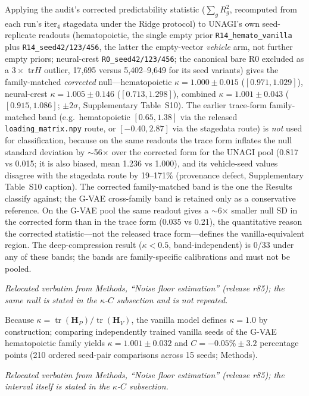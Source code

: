 \documentclass[11 pt,a4 paper]{article}
\begin{document}
Applying the audit's corrected predictability statistic ($\sum_g R^2_g$, recomputed from each run's iter$_4$ stagedata under the Ridge protocol) to UNAGI's own seed-replicate readouts (hematopoietic, the single empty prior \texttt{R14\_hemato\_vanilla} plus \texttt{R14\_seed42/123/456}, the latter the empty-vector \emph{vehicle} arm, not further empty priors; neural-crest \texttt{R0\_seed42/123/456}; the canonical bare R0 excluded as a $3\times$ tr$H$ outlier, 17{,}695 versus 5,402--9,649 for its seed variants) gives the family-matched \emph{corrected} null---hematopoietic $\kappa=1.000\pm0.015$ ($[0.971,1.029]$), neural-crest $\kappa=1.005\pm0.146$ ($[0.713,1.298]$), combined $\kappa=1.001\pm0.043$ ($[0.915,1.086]$; $\pm2\sigma$, Supplementary Table~S10). The earlier trace-form family-matched band (e.g.\ hematopoietic $[0.65,1.38]$ via the released \texttt{loading\_matrix.npy} route, or $[-0.40,2.87]$ via the stagedata route) is \emph{not} used for classification, because on the same readouts the trace form inflates the null standard deviation by $\sim$56$\times$ over the corrected form for the UNAGI pool (0.817 vs 0.015; it is also biased, mean 1.236 vs 1.000), and its vehicle-seed values disagree with the stagedata route by 19--171\% (provenance defect, Supplementary Table~S10 caption). The corrected family-matched band is the one the Results classify against; the G-VAE cross-family band is retained only as a conservative reference. On the G-VAE pool the same readout gives a $\sim$6$\times$ smaller null SD in the corrected form than in the trace form (0.035 vs 0.21), the quantitative reason the corrected statistic---not the released trace form---defines the vanilla-equivalent region. The deep-compression result ($\kappa<0.5$, band-independent) is 0/33 under any of these bands; the bands are family-specific calibrations and must not be pooled.

\noindent\emph{Relocated verbatim from Methods, ``Noise floor estimation'' (release r85); the same null is stated in the $\kappa$-$C$ subsection and is not repeated.}

Because $\kappa=\operatorname{tr}(\mathbf{H}_P)/\operatorname{tr}(\mathbf{H}_V)$, the vanilla model defines $\kappa=1.0$ by construction; comparing independently trained vanilla seeds of the G-VAE hematopoietic family yields $\kappa=1.001\pm0.032$ and $C=-0.05\%\pm3.2$ percentage points (210 ordered seed-pair comparisons across 15 seeds; Methods).

\noindent\emph{Relocated verbatim from Methods, ``Noise floor estimation'' (release r85); the interval itself is stated in the $\kappa$-$C$ subsection.}
\end{document}
